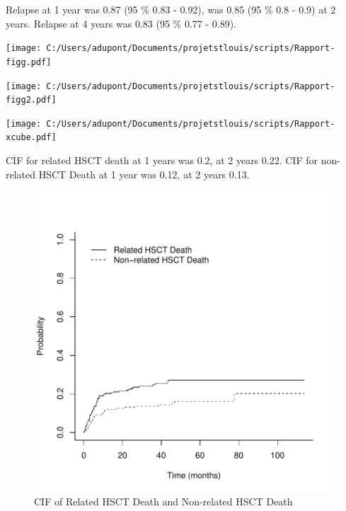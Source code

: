 \documentclass[a4paper,11pt] {article}
\begin{document}
\pagebreak
Relapse at 1 year was 0.87 (95 \% 0.83 - 0.92), was 0.85 (95 \% 0.8 - 0.9) at 2 years. Relapse at 4 years was 0.83 (95 \% 0.77 - 0.89).
\\
\begin{center}
\texttt{[image: C:/Users/adupont/Documents/projetstlouis/scripts/Rapport-figg.pdf]}

\end{center}
\begin{center}
\texttt{[image: C:/Users/adupont/Documents/projetstlouis/scripts/Rapport-figg2.pdf]}

\end{center}
\begin{center} 
 
\texttt{[image: C:/Users/adupont/Documents/projetstlouis/scripts/Rapport-xcube.pdf]}



\end{center}
\pagebreak
CIF for related HSCT death at 1 years was 0.2, at 2 years  0.22.
CIF for non-related HSCT Death at 1 year was 0.12, at 2 years  0.13.
\begin{figure}[h]
\begin{center}
\includegraphics{Rapport-fig5}
\end{center}
\caption{CIF of Related HSCT Death and Non-related HSCT Death}
\label{fig5}
\end{figure}
\end{document}
